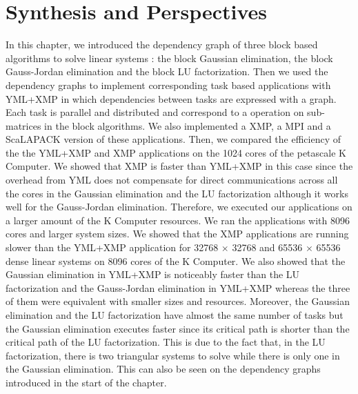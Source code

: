 \section{Synthesis and Perspectives}
In this chapter, we introduced the dependency graph of three block based algorithms to solve linear systems : the block Gaussian elimination, the block Gauss-Jordan elimination and the block LU factorization.
Then we used the dependency graphs to implement corresponding task based applications with YML+XMP in which dependencies between tasks are expressed with a graph.
Each task is parallel and distributed and correspond to a operation on sub-matrices in the block algorithms.
We also implemented a XMP, a MPI and a ScaLAPACK version of these applications.
Then, we compared the efficiency of the the YML+XMP and XMP applications on the 1024 cores of the petascale K Computer.
We showed that XMP is faster than YML+XMP in this case since the overhead from YML does not compensate for direct communications across all the cores in the Gaussian elimination and the LU factorization although it works well for the Gauss-Jordan elimination.
Therefore, we executed our applications on a larger amount of the K Computer resources.
We ran the applications with 8096 cores and larger system sizes.
We showed that the XMP applications are running slower than the YML+XMP application for 32768 $\times$ 32768 and 65536 $\times$ 65536 dense linear systems on 8096 cores of the K Computer.
We also showed that the Gaussian elimination in YML+XMP is noticeably faster than the LU factorization and the Gauss-Jordan elimination in YML+XMP whereas the three of them were equivalent with smaller sizes and resources.
Moreover, the Gaussian elimination and the LU factorization have almost the same number of tasks but the Gaussian elimination executes faster since its critical path is shorter than the critical path of the LU factorization.
This is due to the fact that, in the LU factorization, there is two triangular systems to solve while there is only one in the Gaussian elimination.
This can also be seen on the dependency graphs introduced in the start of the chapter.

